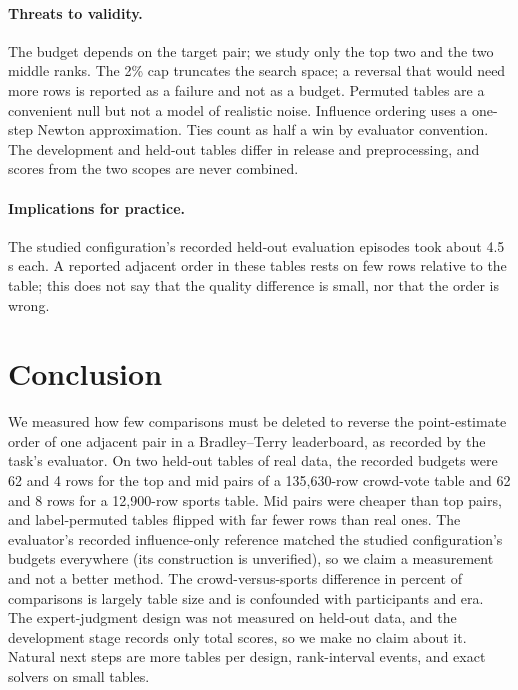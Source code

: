\documentclass{article}
\begin{document}
\paragraph{Threats to validity.} The budget depends on the target pair; we study only the top two and the two middle ranks. The 2\% cap truncates the search space; a reversal that would need more rows is reported as a failure and not as a budget. Permuted tables are a convenient null but not a model of realistic noise. Influence ordering uses a one-step Newton approximation. Ties count as half a win by evaluator convention. The development and held-out tables differ in release and preprocessing, and scores from the two scopes are never combined.

\paragraph{Implications for practice.} The studied configuration's recorded held-out evaluation episodes took about 4.5 s each. A reported adjacent order in these tables rests on few rows relative to the table; this does not say that the quality difference is small, nor that the order is wrong.

\section{Conclusion}
We measured how few comparisons must be deleted to reverse the point-estimate order of one adjacent pair in a Bradley--Terry leaderboard, as recorded by the task's evaluator. On two held-out tables of real data, the recorded budgets were 62 and 4 rows for the top and mid pairs of a 135,630-row crowd-vote table and 62 and 8 rows for a 12,900-row sports table. Mid pairs were cheaper than top pairs, and label-permuted tables flipped with far fewer rows than real ones. The evaluator's recorded influence-only reference matched the studied configuration's budgets everywhere (its construction is unverified), so we claim a measurement and not a better method. The crowd-versus-sports difference in percent of comparisons is largely table size and is confounded with participants and era. The expert-judgment design was not measured on held-out data, and the development stage records only total scores, so we make no claim about it. Natural next steps are more tables per design, rank-interval events, and exact solvers on small tables.\label{lastbodypage}

\clearpage


\end{document}
